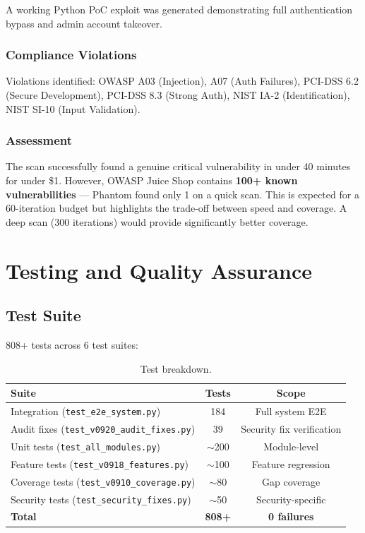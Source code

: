 \documentclass[12pt,a4paper]{report}
\begin{document}
A working Python PoC exploit was generated demonstrating full authentication bypass and admin account takeover.

\subsection{Compliance Violations}

Violations identified: OWASP A03 (Injection), A07 (Auth Failures), PCI-DSS 6.2 (Secure Development), PCI-DSS 8.3 (Strong Auth), NIST IA-2 (Identification), NIST SI-10 (Input Validation).

\subsection{Assessment}

The scan successfully found a genuine critical vulnerability in under 40 minutes for under \$1. However, OWASP Juice Shop contains \textbf{100+ known vulnerabilities} --- Phantom found only 1 on a quick scan. This is expected for a 60-iteration budget but highlights the trade-off between speed and coverage. A deep scan (300 iterations) would provide significantly better coverage.


\chapter{Testing and Quality Assurance}

\section{Test Suite}

808+ tests across 6 test suites:

\begin{table}[H]
\centering
\caption{Test breakdown.}
\begin{tabular}{lcc}
\toprule
\textbf{Suite} & \textbf{Tests} & \textbf{Scope} \\
\midrule
Integration (\texttt{test\_e2e\_system.py})      & 184   & Full system E2E \\
Audit fixes (\texttt{test\_v0920\_audit\_fixes.py}) & 39  & Security fix verification \\
Unit tests (\texttt{test\_all\_modules.py})       & $\sim$200 & Module-level \\
Feature tests (\texttt{test\_v0918\_features.py})  & $\sim$100 & Feature regression \\
Coverage tests (\texttt{test\_v0910\_coverage.py}) & $\sim$80  & Gap coverage \\
Security tests (\texttt{test\_security\_fixes.py}) & $\sim$50  & Security-specific \\
\midrule
\textbf{Total} & \textbf{808+} & \textbf{0 failures} \\
\bottomrule
\end{tabular}
\end{table}
\end{document}
